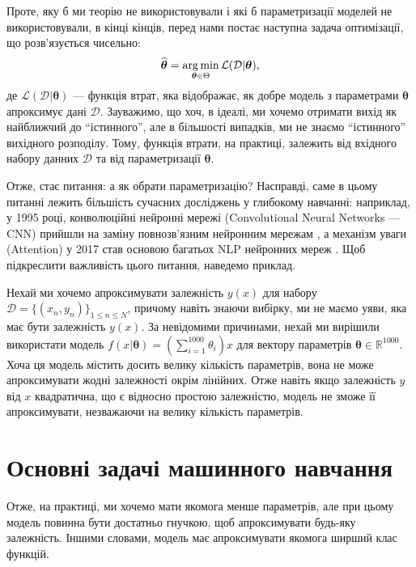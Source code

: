 Проте, яку б ми теорію не використовували і які б параметризації моделей не
використовували, в кінці кінців, перед нами постає наступна задача оптимізації, що
розв'язується чисельно:
\begin{equation}
	\widehat{\boldsymbol{\theta}} = \operatorname*{arg\,min}_{\boldsymbol{\theta} \in \Theta} \mathcal{L}(\mathcal{D}|\boldsymbol{\theta}),
\end{equation}
де $\mathcal{L}(\mathcal{D}|\boldsymbol{\theta})$ --- функція втрат, яка
відображає, як добре модель з параметрами $\boldsymbol{\theta}$ апроксимує дані
$\mathcal{D}$. Зауважимо, що хоч, в ідеалі, ми хочемо отримати вихід як
найближчий до ``істинного'', але в більшості випадків, ми не знаємо
``істинного'' вихідного розподілу. Тому, функція втрати, на практиці, залежить
від вхідного набору данних $\mathcal{D}$ та від параметризації
$\boldsymbol{\theta}$.

Отже, стає питання: а як обрати параметризацію? Насправді, саме в цьому питанні
лежить більшість сучасних досліджень у глибокому навчанні: наприклад, у 1995
році, конволюційні нейронні мережі (Convolutional Neural Networks --- CNN)
прийшли на заміну повнозв'язним нейронним мережам \cite{lecun}, а механізм уваги
(Attention) у 2017 став основою багатьох NLP нейронних мереж \cite{attention}.
Щоб підкреслити важливість цього питання, наведемо приклад.

\begin{example}
	Нехай ми хочемо апроксимувати залежність $y(x)$ для набору $\mathcal{D} =
	\{(x_n,y_n)\}_{1 \leq n \leq N}$, причому навіть знаючи вибірку, ми не маємо
	уяви, яка має бути залежність $y(x)$. За невідомими причинами, нехай ми
	вирішили використати модель $f(x|\boldsymbol{\theta}) =
	\left(\sum_{i=1}^{1000}\theta_i\right)x$ для вектору параметрів
	$\boldsymbol{\theta} \in \mathbb{R}^{1000}$. Хоча ця модель містить досить
	велику кількість параметрів, вона не може апроксимувати жодні залежності
	окрім лінійних. Отже навіть якщо залежність $y$ від $x$ квадратична, що
	є відносно простою залежністю, модель не зможе її апроксимувати, незважаючи 
	на велику кількість параметрів.
\end{example}

\section{Основні задачі машинного навчання}

Отже, на практиці, ми хочемо мати якомога менше параметрів, але при цьому 
модель повинна бути достатньо гнучкою, щоб апроксимувати будь-яку залежність. 
Іншими словами, модель має апроксимувати якомога ширший клас 
функцій. 


